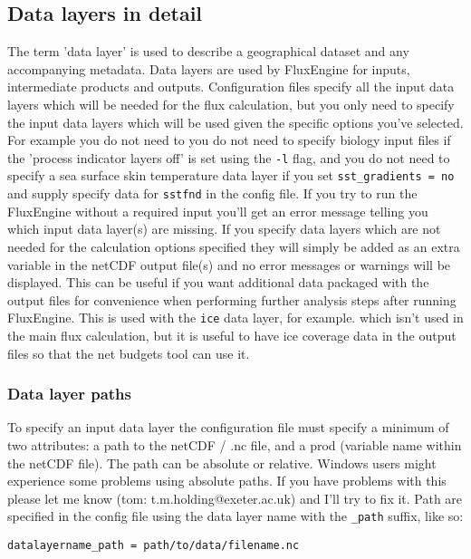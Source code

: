 \documentclass[]{scrartcl}
\begin{document}
{\subsection{Data layers in detail} \label{defining_data_layers}
The term 'data layer' is used to describe a geographical dataset and any accompanying metadata. Data layers are used by FluxEngine for inputs, intermediate products and outputs. Configuration files specify all the input data layers which will be needed for the flux calculation, but you only need to specify the input data layers which will be used given the specific options you’ve selected. For example you do not need to you do not need to specify biology input files if the 'process indicator layers off' is set using the \texttt{-l} flag, and you do not need to specify a sea surface skin temperature data layer if you set \texttt{sst\_gradients = no} and supply specify data for \texttt{sstfnd} in the config file. If you try to run the FluxEngine without a required input you’ll get an error message telling you which input data layer(s) are missing. If you specify data layers which are not needed for the calculation options specified they will simply be added as an extra variable in the netCDF output file(s) and no error messages or warnings will be displayed. This can be useful if you want additional data packaged with the output files for convenience when performing further analysis steps after running FluxEngine. This is used with the \texttt{ice} data layer, for example. which isn't used in the main flux calculation, but it is useful to have ice coverage data in the output files so that the net budgets tool can use it.

\subsubsection*{Data layer paths}
To specify an input data layer the configuration file must specify a minimum of two attributes: a path to the netCDF / .nc file, and a prod (variable name within the netCDF file). The path can be absolute or relative. Windows users might experience some problems using absolute paths. If you have problems with this please let me know (tom: t.m.holding@exeter.ac.uk) and I’ll try to fix it. Path are specified in the config file using the data layer name with the \texttt{\_path} suffix, like so:
\begin{lstlisting}
datalayername_path = path/to/data/filename.nc
\end{lstlisting}

}
\end{document}
